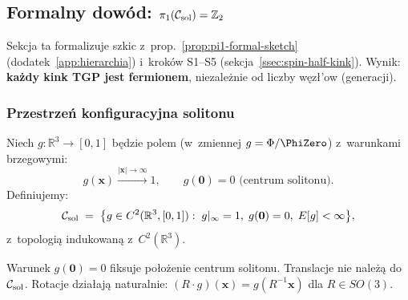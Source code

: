 
\subsection{Formalny dow\'od: $\pi_1(\mathcal{C}_{\rm sol}) = \mathbb{Z}_2$}%
\label{app:pi1-formal-proof}

Sekcja ta formalizuje szkic z~prop.~\ref{prop:pi1-formal-sketch}
(dodatek~\ref{app:hierarchia}) i~krok\'ow S1--S5
(sekcja~\ref{ssec:spin-half-kink}).
Wynik: \textbf{ka\.zdy kink TGP jest fermionem},
niezale\.znie od liczby w\k{e}z\l{}'ow (generacji).

\subsubsection{Przestrze\'n konfiguracyjna solitonu}%
\label{sssec:config-space}

\begin{definition}%
\label{def:C-sol}
Niech $g: \mathbb{R}^3 \to [0,1]$ b\k{e}dzie polem
(w~zmiennej $g = \Phi/\PhiZero$) z~warunkami brzegowymi:
\begin{equation}
  g(\mathbf{x}) \xrightarrow{|\mathbf{x}|\to\infty} 1,
  \qquad
  g(\mathbf{0}) = 0 \text{ (centrum solitonu)}.
\end{equation}
Definiujemy:
\begin{equation}\label{eq:C-sol-def}
  \mathcal{C}_{\rm sol} \;=\;
  \bigl\{ g \in C^2(\mathbb{R}^3, [0,1]) :\;
    g|_\infty = 1,\; g(\mathbf{0}) = 0,\;
    E[g] < \infty \bigr\},
\end{equation}
z~topologi\k{a} indukowaną z~$C^2(\mathbb{R}^3)$.
\end{definition}

\begin{remark}
Warunek $g(\mathbf{0}) = 0$ fiksuje po\l{}o\.zenie centrum solitonu.
Translacje nie nale\.z\k{a} do $\mathcal{C}_{\rm sol}$.
Rotacje dzia\l{}aj\k{a} naturalnie:
$(R \cdot g)(\mathbf{x}) = g(R^{-1}\mathbf{x})$ dla $R \in SO(3)$.
\end{remark}

